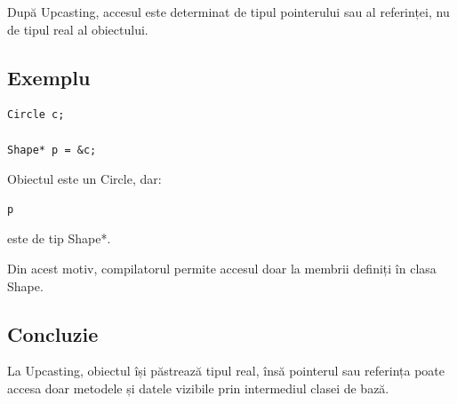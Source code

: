 \documentclass[12pt,a4paper]{article}
\begin{document}
După Upcasting, accesul este determinat de tipul pointerului sau al referinței, nu de tipul real al obiectului.

\subsection{Exemplu}

\begin{verbatim}
Circle c;

Shape* p = &c;
\end{verbatim}

Obiectul este un Circle, dar:

\begin{verbatim}
p
\end{verbatim}

este de tip Shape*.

Din acest motiv, compilatorul permite accesul doar la membrii definiți în clasa Shape.

\subsection{Concluzie}

La Upcasting, obiectul își păstrează tipul real, însă pointerul sau referința poate accesa doar metodele și datele vizibile prin intermediul clasei de bază.
\end{document}
